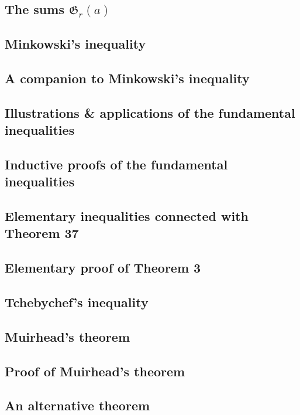 \documentclass[oneside]{book}
\numberwithin{equation}{section}
\begin{document}
\subsection{The sums $\mathfrak{G}_r(a)$}

\subsection{Minkowski's inequality}

\subsection{A companion to Minkowski's inequality}

\subsection{Illustrations \& applications of the fundamental inequalities}

\subsection{Inductive proofs of the fundamental inequalities}

\subsection{Elementary inequalities connected with Theorem 37}

\subsection{Elementary proof of Theorem 3}

\subsection{Tchebychef's inequality}

\subsection{Muirhead's theorem}

\subsection{Proof of Muirhead's theorem}

\subsection{An alternative theorem}
\end{document}
